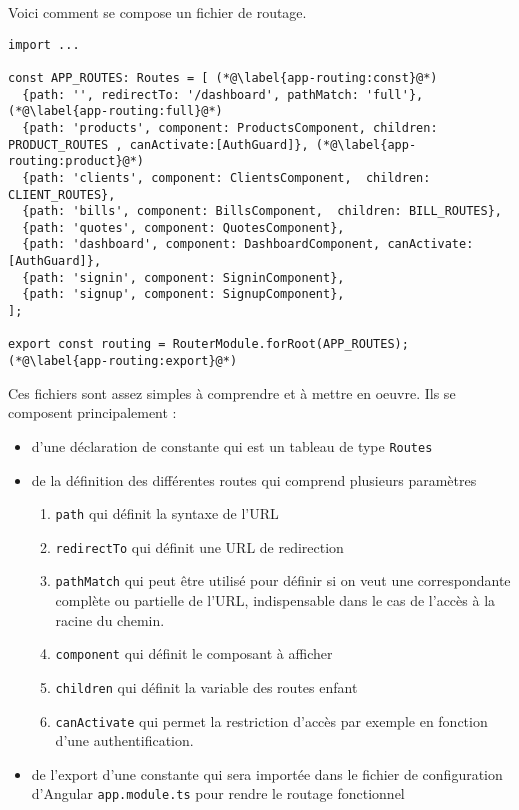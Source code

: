 Voici comment se compose un fichier de routage.
\begin{lstlisting}[style=htmlcssjs, caption={Fichier de routage app.routing.ts}, label=app-routing]
import ...

const APP_ROUTES: Routes = [ (*@\label{app-routing:const}@*)
  {path: '', redirectTo: '/dashboard', pathMatch: 'full'}, (*@\label{app-routing:full}@*)
  {path: 'products', component: ProductsComponent, children: PRODUCT_ROUTES , canActivate:[AuthGuard]}, (*@\label{app-routing:product}@*)
  {path: 'clients', component: ClientsComponent,  children: CLIENT_ROUTES},
  {path: 'bills', component: BillsComponent,  children: BILL_ROUTES},
  {path: 'quotes', component: QuotesComponent},
  {path: 'dashboard', component: DashboardComponent, canActivate:[AuthGuard]},
  {path: 'signin', component: SigninComponent},
  {path: 'signup', component: SignupComponent},
];

export const routing = RouterModule.forRoot(APP_ROUTES);  (*@\label{app-routing:export}@*)
\end{lstlisting}

Ces fichiers sont assez simples à comprendre et à mettre en oeuvre. Ils se composent principalement :

\begin{itemize}
	\item d'une déclaration de constante qui est un tableau de type \texttt{Routes}
	\item de la définition des différentes routes qui comprend plusieurs paramètres
	\begin{enumerate}
		\item \texttt{path} qui définit la syntaxe de l'URL
		\item \texttt{redirectTo} qui définit une URL de redirection
		\item \texttt{pathMatch} qui peut être utilisé pour définir si on veut une correspondante complète ou partielle de l'URL, indispensable dans le cas de l'accès à la racine du chemin.
		\item \texttt{component} qui définit le composant à afficher
		\item \texttt{children} qui définit la variable des routes enfant
		\item \texttt{canActivate} qui permet la restriction d'accès par exemple en fonction d'une authentification.
	\end{enumerate}
	\item de l'export d'une constante qui sera importée dans le fichier de configuration d'Angular \texttt{app.module.ts} pour rendre le routage fonctionnel	
\end{itemize}

